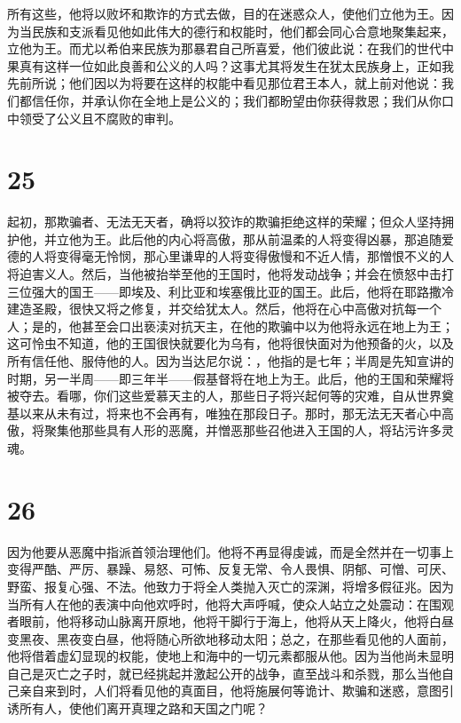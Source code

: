 所有这些，他将以败坏和欺诈的方式去做，目的在迷惑众人，使他们立他为王。因为当民族和支派看见他如此伟大的德行和权能时，他们都会同心合意地聚集起来，立他为王。而尤以希伯来民族为那暴君自己所喜爱，他们彼此说：在我们的世代中果真有这样一位如此良善和公义的人吗？这事尤其将发生在犹太民族身上，正如我先前所说；他们因以为将要在这样的权能中看见那位君王本人，就上前对他说：我们都信任你，并承认你在全地上是公义的；我们都盼望由你获得救恩；我们从你口中领受了公义且不腐败的审判。\par


\section{25}

起初，那欺骗者、无法无天者，确将以狡诈的欺骗拒绝这样的荣耀；但众人坚持拥护他，并立他为王。此后他的内心将高傲，那从前温柔的人将变得凶暴，那追随爱德的人将变得毫无怜悯，那心里谦卑的人将变得傲慢和不近人情，那憎恨不义的人将迫害义人。然后，当他被抬举至他的王国时，他将发动战争；并会在愤怒中击打三位强大的国王——即埃及、利比亚和埃塞俄比亚的国王。此后，他将在耶路撒冷建造圣殿，很快又将之修复，并交给犹太人。然后，他将在心中高傲对抗每一个人；是的，他甚至会口出亵渎对抗天主，在他的欺骗中以为他将永远在地上为王；这可怜虫不知道，他的王国很快就要化为乌有，他将很快面对为他预备的火，以及所有信任他、服侍他的人。因为当达尼尔说：，他指的是七年；半周是先知宣讲的时期，另一半周——即三年半——假基督将在地上为王。此后，他的王国和荣耀将被夺去。看哪，你们这些爱慕天主的人，那些日子将兴起何等的灾难，自从世界奠基以来从未有过，将来也不会再有，唯独在那段日子。那时，那无法无天者心中高傲，将聚集他那些具有人形的恶魔，并憎恶那些召他进入王国的人，将玷污许多灵魂。\par


\section{26}

因为他要从恶魔中指派首领治理他们。他将不再显得虔诚，而是全然并在一切事上变得严酷、严厉、暴躁、易怒、可怖、反复无常、令人畏惧、阴郁、可憎、可厌、野蛮、报复心强、不法。他致力于将全人类抛入灭亡的深渊，将增多假征兆。因为当所有人在他的表演中向他欢呼时，他将大声呼喊，使众人站立之处震动：在围观者眼前，他将移动山脉离开原地，他将干脚行于海上，他将从天上降火，他将白昼变黑夜、黑夜变白昼，他将随心所欲地移动太阳；总之，在那些看见他的人面前，他将借着虚幻显现的权能，使地上和海中的一切元素都服从他。因为当他尚未显明自己是灭亡之子时，就已经挑起并激起公开的战争，直至战斗和杀戮，那么当他自己亲自来到时，人们将看见他的真面目，他将施展何等诡计、欺骗和迷惑，意图引诱所有人，使他们离开真理之路和天国之门呢？\par

